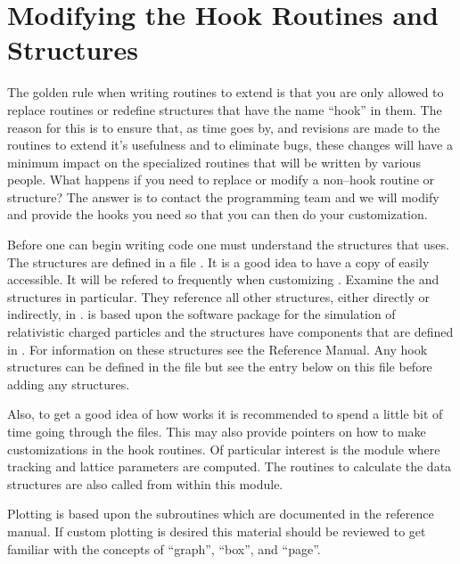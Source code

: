 \section{Modifying the Hook Routines and Structures}

The golden rule when writing routines to extend \tao is that you are
only allowed to replace routines or redefine structures that have the
name ``hook'' in them. The reason for this is to ensure that, as time
goes by, and revisions are made to the \tao routines to extend it's
usefulness and to eliminate bugs, these changes will
have a minimum impact on the specialized routines that will be written
by various people.  What happens if you need to replace
or modify a non--hook routine or structure?  The answer is to contact
the \tao programming team and we will modify \tao and provide the hooks 
you need so that you can then do your customization.

Before one can begin writing code one must understand the structures
that \tao uses. The structures are defined in a file
. It is a good idea to have a copy of
 easily accessible. It will be refered to frequently
when customizing \tao. Examine the  and
 structures in particular. They reference all other
structures, either directly or indirectly, in . 
\tao is based upon the \bmad software
package for the simulation of relativistic charged particles and the
\tao structures have components that are defined in \bmad. For
information on these structures see the \bmad Reference Manual. Any hook 
structures can be defined in the file  but see the entry
below on this file before adding any structures.

Also, to get a good idea of how \tao works it is recommended to spend a
little bit of time going through the  files. This may also
provide pointers on how to make customizations in the hook routines. Of
particular interest is the module  where tracking
and lattice parameters are computed. The routines to calculate the data structures
are also called from within this module.

Plotting is based upon the  subroutines which are documented in
the \bmad reference manual. If custom plotting is desired this material should
be reviewed to get familiar with the concepts of ``graph'', ``box'', and
``page''. 

